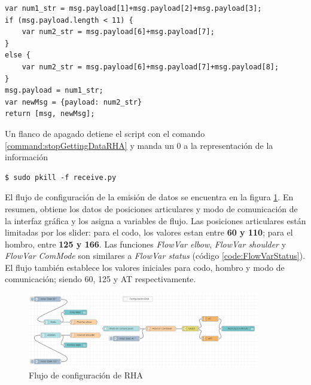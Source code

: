 
\begin{lstlisting}[frame=leftline, caption={Data Interpreter}, label=code:DataInterpreter]
var num1_str = msg.payload[1]+msg.payload[2]+msg.payload[3];
if (msg.payload.length < 11) {
    var num2_str = msg.payload[6]+msg.payload[7];
}
else {
    var num2_str = msg.payload[6]+msg.payload[7]+msg.payload[8];
}
msg.payload = num1_str;
var newMsg = {payload: num2_str}
return [msg, newMsg];
\end{lstlisting}

Un flanco de apagado detiene el script con el comando \ref{command:stopGettingDataRHA} y manda un 0 a la representación de la información


\begin{lstlisting}[frame=single, label=command:stopGettingDataRHA]
$ sudo pkill -f receive.py
\end{lstlisting}

El flujo de configuración de la emisión de datos se encuentra en la figura \ref{fig:configRHA}. En resumen, obtiene los datos de posiciones articulares y modo de comunicación de la interfaz gráfica y los asigna a variables de flujo. Las posiciones articulares están limitadas por los slider: para el codo, los valores estan entre \textbf{60 y 110}; para el hombro, entre \textbf{125 y 166}. Las funciones \textit{FlowVar elbow}, \textit{FlowVar shoulder} y \textit{FlowVar ComMode} son similares a \textit{FlowVar status} (código \ref{code:FlowVarStatus}). El flujo también establece los valores iniciales para codo, hombro y modo de comunicación; siendo 60, 125 y AT respectivamente.

\begin{figure}[H]
\centering
\includegraphics[width=0.9\textwidth]{figuras/configFlowRHA.png}
\caption{Flujo de configuración de RHA}
\label{fig:configRHA}
\end{figure}

